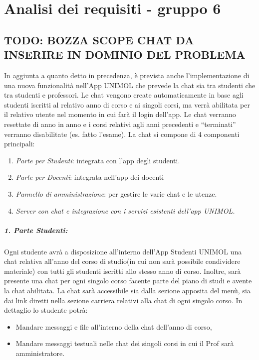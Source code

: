 
\chapter{Analisi dei requisiti - gruppo 6}
\label{ref:requisiti6}


\section{TODO: BOZZA SCOPE CHAT DA INSERIRE IN DOMINIO DEL PROBLEMA}%
In aggiunta a quanto detto in precedenza, è prevista anche l'implementazione di una nuova funzionalità nell’App UNIMOL che prevede la chat sia tra studenti che tra studenti e professori.
Le chat vengono create automaticamente in base agli studenti iscritti al relativo anno di corso e ai singoli corsi, ma verrà abilitata per il relativo utente nel momento in cui farà il login dell’app.
Le chat verranno resettate di anno in anno e i corsi relativi agli anni precedenti e “terminati” verranno disabilitate (es. fatto l’esame).\newline
La chat si compone di 4 componenti principali:
\begin{enumerate}
\item \textit{Parte per Studenti}: integrata con l’app degli studenti.
\item \textit{Parte per Docenti}: integrata nell’app dei docenti
\item \textit{Pannello di amministrazione}: per gestire le varie chat e le utenze.
\item \textit{Server con chat e integrazione con i servizi esistenti dell’app UNIMOL.}
\end{enumerate}
\paragraph{1. Parte Studenti:\newline}
Ogni studente avrà a disposizione all’interno dell’App Studenti UNIMOL una chat relativa all’anno del corso di studio(in cui non sarà possibile condividere materiale) con tutti gli studenti iscritti allo stesso anno di corso. Inoltre, sarà presente una chat per ogni singolo corso facente parte del piano di studi e avente la chat abilitata.
La chat sarà accessibile sia dalla sezione apposita del menù, sia dai link diretti nella sezione carriera relativi alla chat di ogni singolo corso.
In dettaglio lo studente potrà:
\begin{itemize}
\item  Mandare messaggi e file all’interno della chat dell’anno di corso,
\item Mandare messaggi testuali nelle chat dei singoli corsi in cui il Prof sarà amministratore.
\end{itemize}

